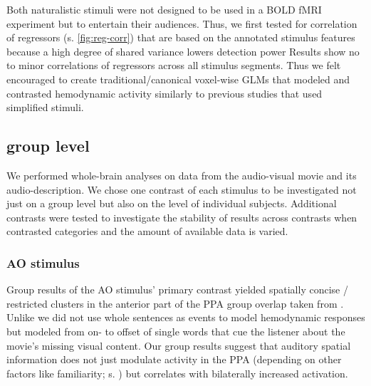 \documentclass[english]{article}
\begin{document}
Both naturalistic stimuli were not designed to be used in a BOLD fMRI experiment
but to entertain their audiences.
Thus, we first tested for correlation of regressors (s. \ref{fig:reg-corr}) that
are based on the annotated stimulus features because a high degree of shared
variance lowers detection power
Results show no to minor correlations of regressors across all stimulus
segments.
Thus we felt encouraged to create traditional/canonical voxel-wise GLMs that
modeled and contrasted hemodynamic activity similarly to previous studies that
used simplified stimuli.







\subsection{group level}

We performed whole-brain analyses on data from the audio-visual movie and its
audio-description. We chose one contrast of each stimulus to be investigated not
just on a group level but also on the level of individual subjects. Additional
contrasts were tested to investigate the stability of results across contrasts
when contrasted categories and the amount of available data is varied.


\subsubsection{AO stimulus}

Group results of the AO stimulus' primary contrast yielded spatially
concise / restricted clusters in the anterior part of the PPA group overlap
taken from \citep{sengupta2016extension}.
Unlike \citep{aziz2008modulation} we did not use whole sentences as events to
model hemodynamic responses but modeled from on- to offset of single words
that cue the listener about the movie's missing visual content.
Our group results suggest that auditory spatial information does not just
modulate activity in the PPA (depending on other factors like familiarity; s.
\citep{aziz2008modulation}) but correlates with bilaterally increased
activation.
\end{document}

